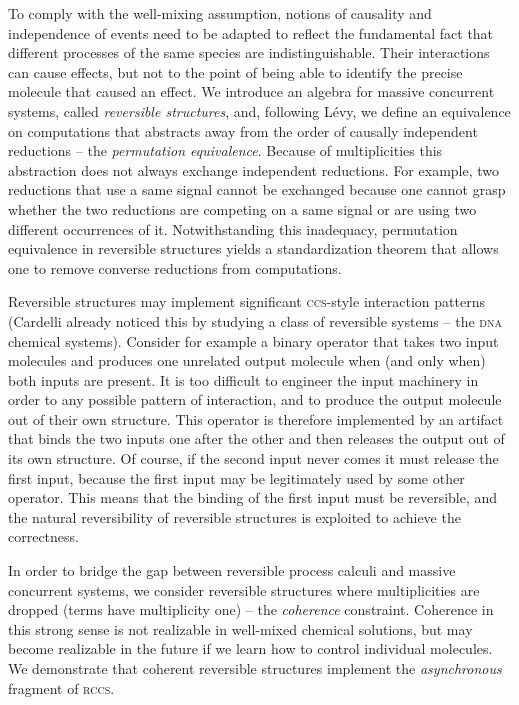 \documentclass{mecbic}
\newcommand{\ccs}{\textsc{ccs}}
\newcommand{\rccs}{\textsc{rccs}}
\newcommand{\DNA}{\textsc{dna}}
\begin{document}
To comply with the well-mixing assumption,
notions of causality and independence of events need to be
adapted to reflect the fundamental fact that different processes of the
same  species are indistinguishable. Their interactions can cause
effects, but not to the point of being able to identify the precise
molecule that caused an effect.
We introduce an algebra for massive concurrent systems, called
{\it reversible structures}, and,
following L\'evy, we define an equivalence on computations
that abstracts away from the order of causally independent reductions
-- the {\it permutation equivalence}. Because of multiplicities
this abstraction
does not always exchange
independent reductions. For example, two reductions that use a same
signal cannot be exchanged because one cannot grasp
whether the two reductions are competing on a same signal or are using
two different occurrences of it.
Notwithstanding this inadequacy, permutation equivalence in
reversible structures yields a standardization theorem
that allows one to remove converse reductions from computations.

Reversible structures may implement significant {\ccs}-style interaction
patterns (Cardelli already noticed this by studying a class of reversible systems -- the
{\DNA} chemical systems).
Consider for example a binary operator that takes two input molecules and produces one unrelated output molecule when (and only when) both inputs are present. It is too difficult to engineer the input machinery
in order to any possible pattern of interaction, and to produce the output molecule out of their own structure. This operator is therefore implemented by an artifact that binds the two inputs one after the other
and then releases the output out of its own structure.
Of course, if the second input never comes it must release the first input, because the first input may be legitimately used by some other operator. This means that the binding of the first input must be reversible, and the natural reversibility of reversible structures is exploited to achieve the correctness.

In order to bridge the gap between reversible process calculi and
massive concurrent systems, we consider reversible structures where multiplicities are dropped (terms have multiplicity one) -- the
{\it coherence}
constraint. Coherence in this strong sense is not realizable in
well-mixed chemical solutions, but may become realizable in
the future if we learn how to control individual
molecules. We demonstrate that coherent reversible structures
implement the {\it asynchronous} fragment of {\rccs}.
\end{document}
